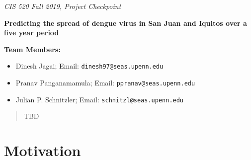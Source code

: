 \documentclass[english]{article}
\begin{document}

\emph{\footnotesize{CIS 520 Fall 2019, Project Checkpoint}}


\vspace{12pt}



\textbf{\Large{Predicting the spread of dengue virus in San Juan and Iquitos over a five year period}}

\vspace{1cm}

\textbf{Team Members:}

\begin{itemize}
 \item Dinesh Jagai; Email: \texttt{dinesh97@seas.upenn.edu}
 \item Pranav Panganamamula; Email: \texttt{ppranav@seas.upenn.edu}
 \item Julian P. Schnitzler; Email: \texttt{schnitzl@seas.upenn.edu} 
\end{itemize}

\hline


\begin{abstract}
TBD
\end{abstract}


\section{Motivation}
\end{document}

